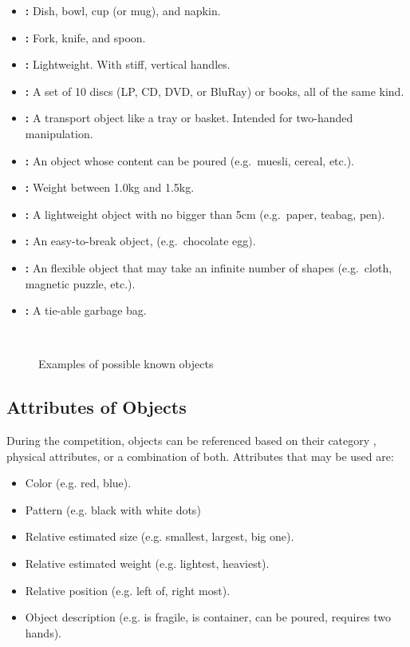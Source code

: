 \begin{itemize}
	\item \textbf{:} Dish, bowl, cup (or mug), and napkin.
	\item \textbf{:} Fork, knife, and spoon.
	\item \textbf{:} Lightweight. With stiff, vertical handles.
	\item \textbf{:} A set of 10 discs (LP, CD, DVD, or BluRay) or books, all of the same kind.
	\item \textbf{:} A transport object like a tray or basket. Intended for two-handed manipulation.
	\item \textbf{:} An object whose content can be poured (e.g.~muesli, cereal, etc.).
	\item \textbf{:} Weight between 1.0kg and 1.5kg.
	\item \textbf{:} A lightweight object with no bigger than 5cm (e.g.~paper, teabag, pen).
	\item \textbf{:} An easy-to-break object, (e.g.~chocolate egg).
	\item \textbf{:} An flexible object that may take an infinite number of shapes (e.g.~cloth, magnetic puzzle, etc.).
	\item \textbf{:} A tie-able garbage bag.
\end{itemize}


\begin{figure}[H]
	\centering
	~
	~
	\caption{Examples of possible known objects}
	\label{fig:scenario_containers}
\end{figure}

\subsection{Attributes of Objects}
\label{rule:scenario_objects_attributes}
During the competition, objects can be referenced based on their category , physical attributes, or a combination of both.
Attributes that may be used are:
\begin{itemize}
	\item Color (e.g. red, blue).
	\item Pattern (e.g. black with white dots)
	\item Relative estimated size (e.g. smallest, largest, big one).
	\item Relative estimated weight (e.g. lightest, heaviest).
	\item Relative position (e.g. left of, right most).
	\item Object description (e.g. is fragile, is container, can be poured, requires two hands).
\end{itemize}

